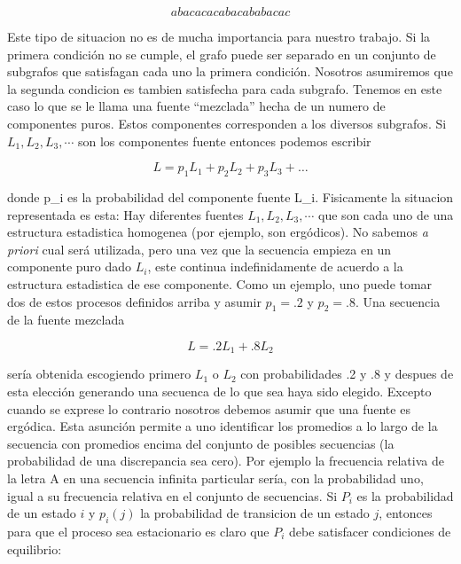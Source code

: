 \begin{equation}
a b a c a c a c a b a c a b a b a c a c
\end{equation}

Este tipo de situacion no es de mucha importancia para nuestro trabajo.
Si la primera condici\'{o}n no se cumple, el grafo puede ser separado en
un conjunto de subgrafos que satisfagan cada uno la primera condici\'{o}n.
Nosotros asumiremos que la segunda condicion es tambien satisfecha
para cada subgrafo.  Tenemos en este caso lo que se le llama una fuente ``mezclada''
hecha de un numero de componentes puros. Estos componentes corresponden
a los diversos subgrafos. Si $L_{1}, L_{2}, L_{3}, \cdots$ son los componentes
fuente entonces podemos escribir

\begin{equation}
L = p_{1}L_{1} + p_{2}L_{2} + p_{3}L_{3} + \ldots
\end{equation}

donde p_{i} es la probabilidad del componente fuente L_{i}.
Fisicamente la situacion representada es esta: Hay diferentes fuentes
$L_{1}, L_{2}, L_{3}, \cdots$ que son cada uno de una estructura estadistica
homogenea (por ejemplo, son erg\'{o}dicos). No sabemos \textit{a priori} cual será utilizada,
pero una vez que la secuencia empieza en un componente puro dado $L_{i}$, este continua
indefinidamente de acuerdo a la estructura estadistica de ese componente.
Como un ejemplo, uno puede tomar dos de estos procesos definidos arriba y asumir
$p_{1} = .2$ y $p_{2} = .8$. Una secuencia de la fuente mezclada

\begin{equation}
L = .2L_{1} + .8L_{2}
\end{equation}

ser\'{i}a obtenida escogiendo primero $L_{1}$ o $L_{2}$ con probabilidades .2 y .8 y despues
de esta elecci\'{o}n generando una secuenca de lo que sea haya sido elegido.
Excepto cuando se exprese lo contrario nosotros debemos asumir que una fuente es erg\'{o}dica. Esta
asunci\'{o}n permite a uno identificar los promedios a lo largo de la secuencia con promedios encima
del conjunto de posibles secuencias (la probabilidad de una discrepancia sea cero). Por ejemplo
la frecuencia relativa de la letra A en una secuencia infinita particular ser\'{i}a, con la probabilidad
uno, igual a su frecuencia relativa en el conjunto de secuencias.
Si $P_{i}$ es la probabilidad de un estado $i$ y $p_{i}(j)$ la probabilidad de transicion de
un estado $j$, entonces para que el proceso sea estacionario es claro que $P_{i}$ debe
satisfacer condiciones de equilibrio:

